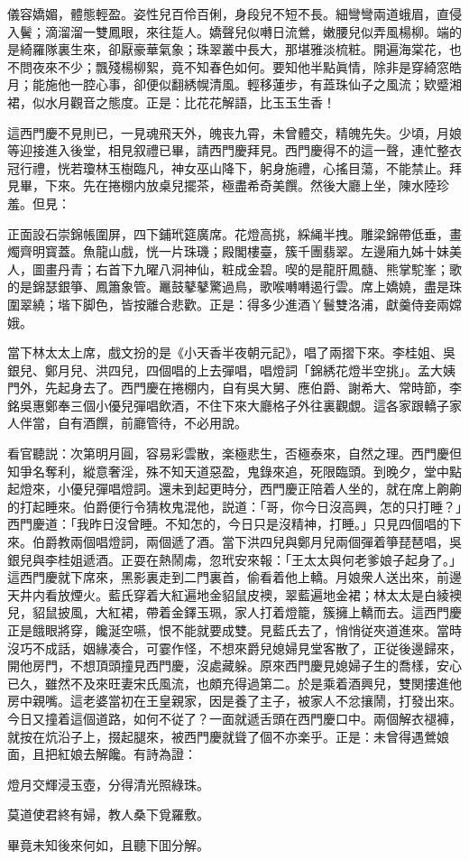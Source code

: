 \begin{myquote}
儀容嬌媚，體態輕盈。姿性兒百伶百俐，身段兒不短不長。細彎彎兩道蛾眉，直侵入鬢；滴溜溜一雙鳳眼，來往踅人。嬌聲兒似囀日流鶯，嫩腰兒似弄風楊柳。端的是綺羅隊裏生來，卻厭豪華氣象；珠翠叢中長大，那堪雅淡梳粧。開遍海棠花，也不問夜來不少；飄殘楊柳絮，竟不知春色如何。要知他半點眞情，除非是穿綺窓皓月；能施他一腔心事，卻便似翻綉幌清風。輕移蓮步，有蕋珠仙子之風流；欵蹙湘裙，似水月觀音之態度。正是：比花花解語，比玉玉生香！
\end{myquote}

這西門慶不見則已，一見魂飛天外，魄丧九霄，未曾體交，精魄先失。少頃，月娘等迎接進入後堂，相見叙禮已畢，請西門慶拜見。西門慶得不的這一聲，連忙整衣冠行禮，恍若瓊林玉樹臨凡，神女巫山降下，躬身施禮，心搖目蕩，不能禁止。拜見畢，下來。先在捲棚内放桌兒擺茶，極盡希奇美饌。然後大廳上坐，陳水陸珍羞。但見：

\begin{myquote}
正面設石崇錦帳圍屏，四下鋪玳筵廣席。花燈高挑，綵䋲半拽。雕梁錦帶低垂，畫燭齊明寳蓋。魚龍山戲，恍一片珠璣；殿閣樓臺，簇千團翡翠。左邊廂九姊十妹美人，圖畫丹青；右首下九曜八洞神仙，粧成金碧。喫的是龍肝鳳髓、熊掌駝峯；歌的是錦瑟銀箏、鳳簫象管。鼉鼓鼕鼕驚過鳥，歌喉囀囀遏行雲。席上嬌嬈，盡是珠圍翠繞；堦下脚色，皆按離合悲歡。正是：得多少進酒丫鬟雙洛浦，獻羹侍妾兩嫦娥。
\end{myquote}

當下林太太上席，戲文扮的是《小天香半夜朝元記》，唱了兩摺下來。李桂姐、吳銀兒、鄭月兒、洪四兒，四個唱的上去彈唱，唱燈詞「錦綉花燈半空挑」。孟大姨門外，先起身去了。西門慶在捲棚内，自有吳大舅、應伯爵、謝希大、常時節，李銘吳惠鄭奉三個小優兒彈唱飲酒，不住下來大廳格子外往裏觀覷。這各家跟轎子家人伴當，自有酒饌，前廳管待，不必用說。

看官聽説：次第明月圓，容易彩雲散，楽極悲生，否極泰來，自然之理。西門慶但知爭名奪利，縱意奢淫，殊不知天道惡盈，鬼錄來追，死限臨頭。到晚夕，堂中點起燈來，小優兒彈唱燈詞。還未到起更時分，西門慶正陪着人坐的，就在席上齁齁的打起睡來。伯爵便行令猜枚鬼混他，説道：「哥，你今日沒高興，怎的只打睡？」西門慶道：「我昨日沒曾睡。不知怎的，今日只是沒精神，打睡。」只見四個唱的下來。伯爵教兩個唱燈詞，兩個遞了酒。當下洪四兒與鄭月兒兩個彈着箏琵琶唱，吳銀兒與李桂姐遞酒。正耍在熱鬧䖏，忽玳安來報：「王太太與何老爹娘子起身了。」這西門慶就下席來，黑影裏走到二門裏首，偷看着他上轎。月娘衆人送出來，前邊天井内看放煙火。藍氏穿着大紅遍地金貂鼠皮襖，翠藍遍地金裙；林太太是白綾襖兒，貂鼠披風，大紅裙，帶着金鐸玉珮，家人打着燈籠，簇擁上轎而去。這西門慶正是餓眼將穿，饞涎空嚥，恨不能就要成雙。見藍氏去了，悄悄従夾道進來。當時沒巧不成話，姻緣凑合，可霎作怪，不想來爵兒媳婦見堂客散了，正従後邊歸來，開他房門，不想頂頭撞見西門慶，沒處藏躲。原來西門慶見媳婦子生的喬樣，安心已久，雖然不及來旺妻宋氏風流，也頗充得過第二。於是乘着酒興兒，雙関摟進他房中親嘴。這老婆當初在王皇親家，因是養了主子，被家人不忿攘鬧，打發出來。今日又撞着這個道路，如何不従了？一面就遞舌頭在西門慶口中。兩個解衣褪褲，就按在炕沿子上，掇起腿來，被西門慶就聳了個不亦楽乎。正是：未曾得遇鶯娘面，且把紅娘去解饞。有詩為證：

\begin{myquote}
燈月交輝浸玉壺，分得清光照綠珠。

莫道使君終有婦，教人桑下覓羅敷。
\end{myquote}

畢竟未知後來何如，且聽下囬分解。

